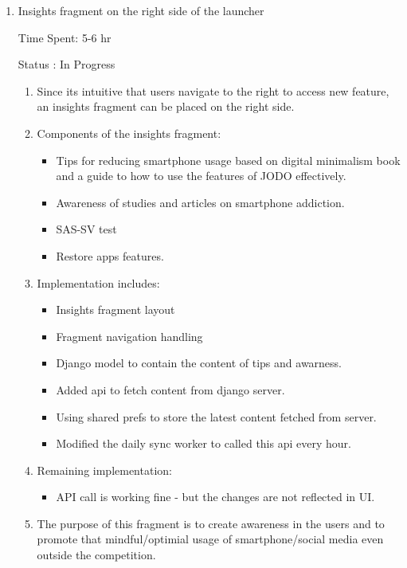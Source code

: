 \documentclass{article}
\begin{document}
\begin{enumerate}
    Time Spent:

    Status : TO DO
    \item Insights fragment on the right side of the launcher

    Time Spent: 5-6 hr

    Status : In Progress
    \begin{enumerate}
        \item Since its intuitive that users navigate to the right to access new feature, an insights fragment can be placed on the right side.
        \item Components of the insights fragment: 
        \begin{itemize}
            \item Tips for reducing smartphone usage based on digital minimalism book and a guide to how to use the features of JODO effectively.
            \item Awareness of studies and articles on smartphone addiction.
            \item SAS-SV test
            \item Restore apps features. 
        \end{itemize}
        \item Implementation includes:
        \begin{itemize}
            \item Insights fragment layout 
            \item Fragment navigation handling
            \item Django model to contain the content of tips and awarness.
            \item Added api to fetch content from django server.
            \item Using shared prefs to store the latest content fetched from server.
            \item Modified the daily sync worker to called this api every hour.
        \end{itemize}
        \item Remaining implementation: 
        \begin{itemize}
            \item API call is working fine - but the changes are not reflected in UI.
        \end{itemize}
        \item The purpose of this fragment is to create awareness in the users and to promote that mindful/optimial usage of smartphone/social media even outside the competition.
    \end{enumerate}


\end{enumerate}
\end{document}
